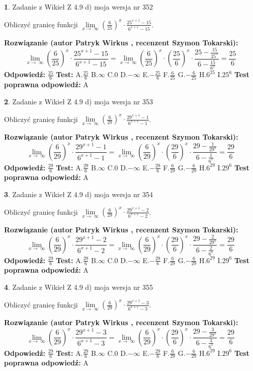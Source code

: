 \documentclass[12pt, a4paper]{article}
\theoremstyle{definition} %
\newtheorem{zad}{}
\newcommand{\zadStart}[1]{\begin{zad}#1\newline}
\newcommand{\zadStop}{\end{zad}}
\newcommand{\rozwStart}[2]{\noindent \textbf{Rozwiązanie (autor #1 , recenzent #2): }\newline}
\newcommand{\rozwStop}{\newline}
\newcommand{\odpStart}{\noindent \textbf{Odpowiedź:}\newline}
\newcommand{\odpStop}{\newline}
\newcommand{\testStart}{\noindent \textbf{Test:}\newline}
\newcommand{\testStop}{\newline}
\newcommand{\kluczStart}{\noindent \textbf{Test poprawna odpowiedź:}\newline}
\newcommand{\kluczStop}{\newline}
\begin{document}
\zadStart{Zadanie z Wikieł Z 4.9 d) moja wersja nr 352}


Obliczyć granicę funkcji  $\lim\limits_{x\to\ \infty}(\frac{6}{25})^{x}\cdot\frac{25^{x+1}-15}{6^{x+1}-15}$.
\zadStop
\rozwStart{Patryk Wirkus}{Szymon Tokarski}
$$\lim\limits_{x\to\ \infty}(\frac{6}{25})^{x}\cdot\frac{25^{x+1}-15}{6^{x+1}-15}=\lim\limits_{x\to\ \infty}(\frac{6}{25})^{x}\cdot(\frac{25}{6})^{x} \cdot \frac{25-\frac{15}{25^{x}}}{6-\frac{15}{6^{x}}} = \frac{25}{6}$$
\rozwStop
\odpStart
$\frac{25}{6}$
\odpStop
\testStart
A.$\frac{25}{6}$ B.$\infty$ C.$0$ D.$-\infty$ E.$-\frac{25}{6}$
F.$\frac{6}{25}$ G.$-\frac{6}{25}$
H.$6^{25}$
I.$25^{6}$
\testStop
\kluczStart
A
\kluczStop



\zadStart{Zadanie z Wikieł Z 4.9 d) moja wersja nr 353}


Obliczyć granicę funkcji  $\lim\limits_{x\to\ \infty}(\frac{6}{29})^{x}\cdot\frac{29^{x+1}-1}{6^{x+1}-1}$.
\zadStop
\rozwStart{Patryk Wirkus}{Szymon Tokarski}
$$\lim\limits_{x\to\ \infty}(\frac{6}{29})^{x}\cdot\frac{29^{x+1}-1}{6^{x+1}-1}=\lim\limits_{x\to\ \infty}(\frac{6}{29})^{x}\cdot(\frac{29}{6})^{x} \cdot \frac{29-\frac{1}{29^{x}}}{6-\frac{1}{6^{x}}} = \frac{29}{6}$$
\rozwStop
\odpStart
$\frac{29}{6}$
\odpStop
\testStart
A.$\frac{29}{6}$ B.$\infty$ C.$0$ D.$-\infty$ E.$-\frac{29}{6}$
F.$\frac{6}{29}$ G.$-\frac{6}{29}$
H.$6^{29}$
I.$29^{6}$
\testStop
\kluczStart
A
\kluczStop



\zadStart{Zadanie z Wikieł Z 4.9 d) moja wersja nr 354}


Obliczyć granicę funkcji  $\lim\limits_{x\to\ \infty}(\frac{6}{29})^{x}\cdot\frac{29^{x+1}-2}{6^{x+1}-2}$.
\zadStop
\rozwStart{Patryk Wirkus}{Szymon Tokarski}
$$\lim\limits_{x\to\ \infty}(\frac{6}{29})^{x}\cdot\frac{29^{x+1}-2}{6^{x+1}-2}=\lim\limits_{x\to\ \infty}(\frac{6}{29})^{x}\cdot(\frac{29}{6})^{x} \cdot \frac{29-\frac{2}{29^{x}}}{6-\frac{2}{6^{x}}} = \frac{29}{6}$$
\rozwStop
\odpStart
$\frac{29}{6}$
\odpStop
\testStart
A.$\frac{29}{6}$ B.$\infty$ C.$0$ D.$-\infty$ E.$-\frac{29}{6}$
F.$\frac{6}{29}$ G.$-\frac{6}{29}$
H.$6^{29}$
I.$29^{6}$
\testStop
\kluczStart
A
\kluczStop



\zadStart{Zadanie z Wikieł Z 4.9 d) moja wersja nr 355}


Obliczyć granicę funkcji  $\lim\limits_{x\to\ \infty}(\frac{6}{29})^{x}\cdot\frac{29^{x+1}-3}{6^{x+1}-3}$.
\zadStop
\rozwStart{Patryk Wirkus}{Szymon Tokarski}
$$\lim\limits_{x\to\ \infty}(\frac{6}{29})^{x}\cdot\frac{29^{x+1}-3}{6^{x+1}-3}=\lim\limits_{x\to\ \infty}(\frac{6}{29})^{x}\cdot(\frac{29}{6})^{x} \cdot \frac{29-\frac{3}{29^{x}}}{6-\frac{3}{6^{x}}} = \frac{29}{6}$$
\rozwStop
\odpStart
$\frac{29}{6}$
\odpStop
\testStart
A.$\frac{29}{6}$ B.$\infty$ C.$0$ D.$-\infty$ E.$-\frac{29}{6}$
F.$\frac{6}{29}$ G.$-\frac{6}{29}$
H.$6^{29}$
I.$29^{6}$
\testStop
\kluczStart
A
\kluczStop
\end{document}
